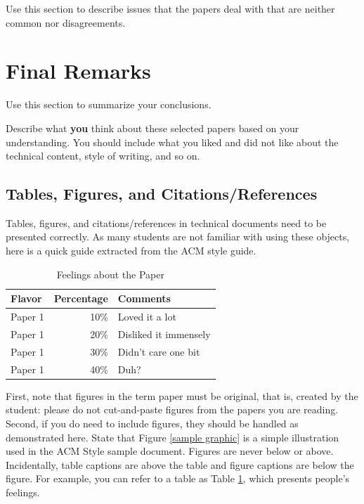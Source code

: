 \documentclass{sig-alternate}
\begin{document}
Use this section to describe issues that the papers deal
with that are neither common nor disagreements.

\section{Final Remarks}
\label{final remarks}

Use this section to summarize your conclusions.

Describe what {\bf you} think about these selected papers
based on your understanding. You should include what you
liked and did not like about the technical content, style of
writing, and so on.

\subsection{Tables, Figures, and Citations/References}

Tables, figures, and citations/references in technical
documents need to be presented correctly. As many students
are not familiar with using these objects, here is a quick
guide extracted from the ACM style guide.

\begin{table}
\centering
\caption{Feelings about the Paper}
\label{FEELINGS}
\begin{tabular}{|l|r|l|} \hline
Flavor&Percentage&Comments\\ \hline
Paper 1 &  10\% & Loved it a lot\\ \hline
Paper 1 &  20\% & Disliked it immensely\\ \hline
Paper 1 &  30\% & Didn't care one bit\\ \hline
Paper 1 &  40\% & Duh?\\ \hline
\end{tabular}
\end{table}


First, note that figures in the term paper must be original,
that is, created by the student: please do not cut-and-paste
figures from the papers you are reading. Second, if you do
need to include figures, they should be handled as
demonstrated here. State that Figure \ref{sample graphic} is
a simple illustration used in the ACM Style sample
document. Figures are never below or above. Incidentally,
table captions are above the table and figure captions are
below the figure. For example, you can refer to a table as Table
\ref{FEELINGS}, which presents people's feelings.
\end{document}
